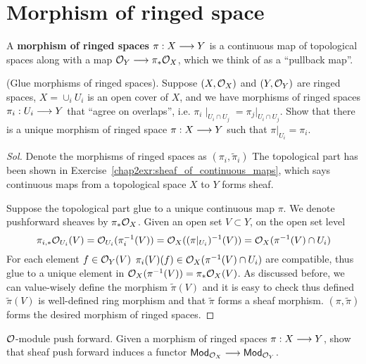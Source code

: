 \documentclass[11pt]{book} %
\begin{document}
\section{Morphism of ringed space}
\begin{definition}
A \textbf{morphism of ringed spaces $\pi:X\longrightarrow Y$}  is a continuous map of topological spaces along with a map ${\cal O}_Y\longrightarrow \pi_*{\cal O}_X$, which we think of as a ``pullback map''.
\end{definition}
\begin{exr}\label{chap6exr:glue_morphisms_of_ringed_spaces}
(Glue morphisms of ringed spaces). Suppose $(X,{\cal O}_X)$ and $(Y,{\cal O}_Y)$ are ringed spaces, $X=\cup_i U_i$ is an open cover of $X$, and we have morphisms of ringed spaces $\pi_i:U_i\longrightarrow Y$ that ``agree on overlaps'', i.e. $\pi_i\mid_{U_i\cap U_j}=\pi_{j}|_{U_i\cap U_j}$. Show that there is a unique morphism of ringed space $\pi:X\longrightarrow Y$ such that $\pi|_{U_i}=\pi_i$.
\end{exr}
\begin{proof}[Sol]
Denote the morphisms of ringed spaces as $(\pi_i,\tilde{\pi}_i)$
The topological part has been shown in Exercise~\ref{chap2exr:sheaf_of_continuous_maps}, which says continuous maps from a topological space $X$ to $Y$ forms sheaf.

Suppose the topological part glue to a unique continuous map $\pi$. We denote pushforward sheaves by $\pi_*{\cal O}_X$. Given an open set $V\subset Y$, on the open set level
$$
\pi_{i,*}{\cal O}_{U_i}(V)={\cal O}_{U_i}(\pi_i^{-1}(V))={\cal O}_X((\pi|_{U_i})^{-1}(V))={\cal O}_X(\pi^{-1}(V)\cap U_i)
$$
For each element $f\in {\cal O}_Y(V)$
$\pi_i(V)(f)\in{\cal O}_X(\pi^{-1}(V)\cap U_i)$ are compatible, thus glue to a unique element in ${\cal O}_X(\pi^{-1}(V))=\pi_*{\cal O}_X(V)$. As discussed before, we can value-wisely define the morphism $\tilde{\pi}(V)$ and it is easy to check thus defined $\tilde{\pi}(V)$ is well-defined ring morphism and that $\tilde{\pi}$ forms a sheaf morphism. 
$(\pi,\tilde{\pi})$ forms the desired morphism of ringed spaces.
\end{proof}
\begin{exr}
${\cal O}$-module push forward. Given a morphism of ringed spaces $\pi:X\longrightarrow Y$, show that sheaf push forward induces a functor $\mathsf{Mod}_{{\cal O}_X}\longrightarrow \mathsf{Mod}_{{\cal O}_Y}$.
\end{exr}
\end{document}
